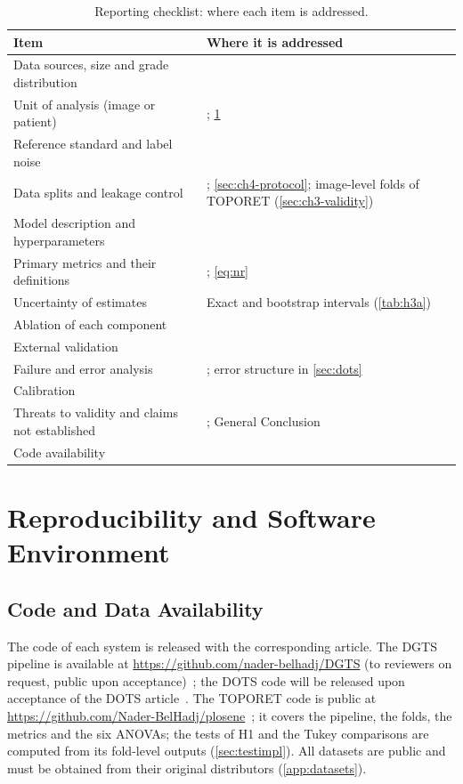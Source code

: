 \begin{table}[H]
\centering
\caption[Reporting checklist]{Reporting checklist: where each item is addressed.}
\label{tab:checklist}
\footnotesize
\begin{tabular}{@{}P{6.0cm} P{8.0cm}@{}}
\toprule
Item & Where it is addressed \\
\midrule
Data sources, size and grade distribution &  \\
Unit of analysis (image or patient) & ; \cref{app:repro} \\
Reference standard and label noise &  \\
Data splits and leakage control & ; \cref{sec:ch4-protocol}; image-level folds of TOPORET (\cref{sec:ch3-validity}) \\
Model description and hyperparameters &  \\
Primary metrics and their definitions & ; \cref{eq:nr} \\
Uncertainty of estimates & Exact and bootstrap intervals (\cref{tab:h3a}) \\
Ablation of each component &  \\
External validation &  \\
Failure and error analysis & ; error structure in \cref{sec:dots} \\
Calibration &  \\
Threats to validity and claims not established & ; General Conclusion \\
Code availability &  \\
\bottomrule
\end{tabular}
\end{table}

\chapter{Reproducibility and Software Environment}
\label{app:repro}

\section{Code and Data Availability}
The code of each system is released with the corresponding article. The DGTS pipeline is
available at \url{https://github.com/nader-belhadj/DGTS} (to reviewers on request, public
upon acceptance)~\cite{belhadj2026dgts}; the DOTS code will be released upon acceptance of
the DOTS article~\cite{belhadj2026dots}. The TOPORET code is public at
\url{https://github.com/Nader-BelHadj/plosene}~\cite{belhadj2025plos}; it covers the
pipeline, the folds, the metrics and the six ANOVAs; the tests of H1 and the Tukey
comparisons are computed from its fold-level outputs (\cref{sec:testimpl}). All datasets are public and must be obtained from their original
distributors (\cref{app:datasets}).

